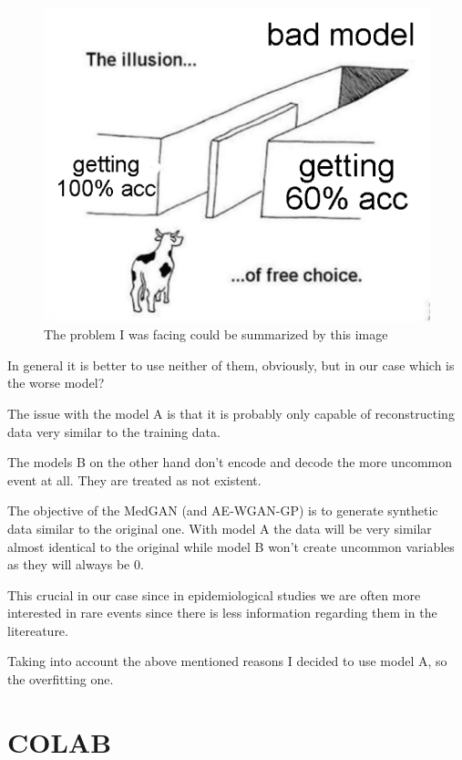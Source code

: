 \documentclass[
  letterpaper,
  DIV=11,
  numbers=noendperiod]{scrreprt}
\begin{document}
\begin{figure}

{\centering \includegraphics{overfitting.png}

}

\caption{The problem I was facing could be summarized by this image}

\end{figure}

In general it is better to use neither of them, obviously, but in our
case which is the worse model?

The issue with the model A is that it is probably only capable of
reconstructing data very similar to the training data.

The models B on the other hand don't encode and decode the more uncommon
event at all. They are treated as not existent.

The objective of the MedGAN (and AE-WGAN-GP) is to generate synthetic
data similar to the original one. With model A the data will be very
similar almost identical to the original while model B won't create
uncommon variables as they will always be 0.

This crucial in our case since in epidemiological studies we are often
more interested in rare events since there is less information regarding
them in the litereature.

Taking into account the above mentioned reasons I decided to use model
A, so the overfitting one.

\part{COLAB}
\end{document}
